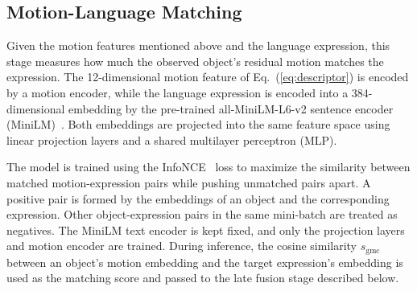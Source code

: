 \documentclass{article}
\begin{document}
\subsection{Motion-Language Matching}
\label{sec:align}
Given the motion features mentioned above and the language expression, this stage measures how much the observed object's residual motion matches the expression. The 12-dimensional motion feature of Eq.~(\ref{eq:descriptor}) is encoded by a motion encoder, while the language expression is encoded into a 384-dimensional embedding by the pre-trained all-MiniLM-L6-v2 sentence encoder (MiniLM)~\cite{sbert}. Both embeddings are projected into the same feature space using linear projection layers and a shared multilayer perceptron (MLP).

The model is trained using the InfoNCE~\cite{infonce} loss to maximize the similarity between matched motion-expression pairs while pushing unmatched pairs apart. A positive pair is formed by the embeddings of an object and the corresponding expression. Other object-expression pairs in the same mini-batch are treated as negatives. The MiniLM text encoder is kept fixed, and only the projection layers and motion encoder are trained. During inference, the cosine similarity $s_{\mathrm{gmc}}$ between an object's motion embedding and the target expression's embedding is used as the matching score and passed to the late fusion stage described below.
\end{document}
